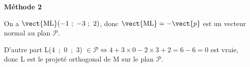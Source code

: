 \textbf{Méthode 2}

On a $\vect{\text{ML}}(-1~;~- 3~;~2)$, donc $\vect{\text{ML}} = - \vect{p}$ est un vecteur normal au plan $\mathcal{P}$.

D'autre part L(4~;~0~;~3) $\in \mathcal{P} \iff 4 + 3 \times 0 - 2 \times 3 + 2 = 6 - 6 = 0$ est vraie, donc L est le projeté orthogonal de M sur le plan $\mathcal P$.
\bigskip


